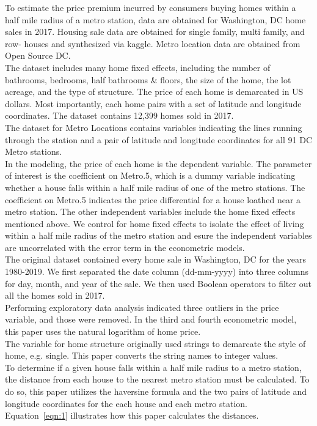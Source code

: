 \documentclass[12pt]{report}
\newcommand\tab[1][.50cm]{\hspace*{#1}}
\begin{document}
To estimate the price premium incurred by consumers buying homes within a half mile radius of a metro station, data are obtained for Washington, DC home sales in 2017. Housing sale data are obtained for single family, multi family, and row- houses and synthesized via kaggle. Metro location data are obtained from Open Source DC. \\
\tab The dataset includes many home fixed effects, including the number of bathrooms, bedrooms, half bathrooms \& floors, the size of the home, the lot acreage, and the type of structure. The price of each home is demarcated in US dollars. Most importantly, each home pairs with a set of latitude and longitude coordinates. The dataset contains 12,399 homes sold in 2017. \\
\tab The dataset for Metro Locations contains variables indicating the lines running through the station and a pair of latitude and longitude coordinates for all 91 DC Metro stations.\\
\tab In the modeling, the price of each home is the dependent variable. The parameter of interest is the coefficient on Metro.5, which is a dummy variable indicating whether a house falls within a half mile radius of one of the metro stations. The coefficient on Metro.5 indicates the price differential for a house loathed near a metro station. The other independent variables include the home fixed effects mentioned above. We control for home fixed effects to isolate the effect of living within a half mile radius of the metro station and esure the independent variables are uncorrelated with the error term in the econometric models.\\
\tab The original dataset contained every home sale in Washington, DC for the years 1980-2019. We first separated the date column (dd-mm-yyyy) into three columns for day, month, and year of the sale. We then used Boolean operators to filter out all the homes sold in 2017.\\
\tab Performing exploratory data analysis indicated three outliers in the price variable, and those were removed. In the third and fourth econometric model, this paper uses the natural logarithm of home price. \\
\tab The variable for home structure originally used strings to demarcate the style of home, e.g. single. This paper converts the string names to integer values.\\
\tab To determine if a given house falls within a half mile radius to a metro station, the distance from each house to the nearest metro station must be calculated. To do so, this paper utilizes the haversine formula and the two pairs of latitude and longitude coordinates for the each house and each metro station. Equation~\ref{eqn:1} illustrates how this paper calculates the distances.
\end{document}
